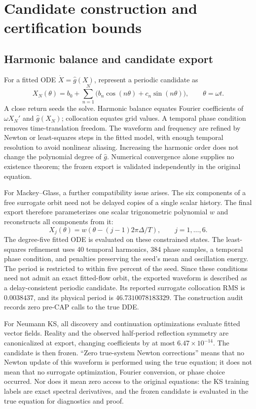 \documentclass[11pt]{article}
\begin{document}
\section{Candidate construction and certification bounds}
\label{sec:cap}

\subsection{Harmonic balance and candidate export}
For a fitted ODE $\dot X=\widehat g(X)$, represent a periodic candidate as
\begin{equation}
 X_N(\theta)=b_0+\sum_{n=1}^{N}
 \bigl(b_n\cos(n\theta)+c_n\sin(n\theta)\bigr),\qquad \theta=\omega t.
\end{equation}
A close return seeds the solve. Harmonic balance equates Fourier coefficients
of $\omega X_N'$ and $\widehat g(X_N)$; collocation equates grid values.
A temporal phase condition removes time-translation freedom. The waveform
and frequency are refined by Newton or least-squares steps in the fitted
model, with enough temporal resolution to avoid nonlinear aliasing.
Increasing the harmonic order does not change the polynomial degree of
$\widehat g$. Numerical convergence alone supplies no existence theorem;
the frozen export is validated independently in the original equation.

For Mackey--Glass, a further compatibility issue arises. The six components of a free surrogate orbit need not be delayed copies of a single scalar history. The final export therefore parameterizes one scalar trigonometric polynomial $w$ and reconstructs all components from it:
\begin{equation}
 X_j(\theta)=w\!\left(\theta-(j-1)2\pi\Delta/T\right),
 \qquad j=1,\ldots,6.
 \label{eq:delaycompatible}
\end{equation}
The degree-five fitted ODE is evaluated on these constrained states. The least-squares refinement uses 40 temporal harmonics, 384 phase samples, a temporal phase condition, and penalties preserving the seed's mean and oscillation energy. The period is restricted to within five percent of the seed. Since these conditions need not admit an exact fitted-flow orbit, the exported waveform is described as a delay-consistent periodic candidate. Its reported surrogate collocation RMS is $0.0038437$, and its physical period is $46.7310078183329$. The construction audit records zero pre-CAP calls to the true DDE.

For Neumann KS, all discovery and continuation optimizations evaluate fitted vector fields. Reality and the observed half-period reflection symmetry are canonicalized at export, changing coefficients by at most $6.47\times10^{-14}$. The candidate is then frozen. ``Zero true-system Newton corrections'' means that no Newton update of this waveform is performed using the true equation; it does not mean that no surrogate optimization, Fourier conversion, or phase choice occurred. Nor does it mean zero access to the original equations: the KS training labels are exact spectral derivatives, and the frozen candidate is evaluated in the true equation for diagnostics and proof.
\end{document}
